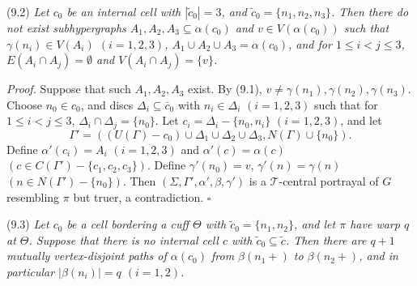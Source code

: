 \stmt
(9.2) \textit{Let $c_0$ be an internal cell with $|\tilde{c}_0| = 3$, and $\tilde{c}_0 = \{n_1, n_2, n_3\}$. Then there do not exist subhypergraphs $A_1, A_2, A_3 \subseteq \alpha(c_0)$ and $v \in V(\alpha(c_0))$ such that $\gamma(n_i) \in V(A_i)$ $(i = 1, 2, 3)$, $A_1 \cup A_2 \cup A_3 = \alpha(c_0)$, and for $1 \le i < j \le 3$, $E(A_i \cap A_j) = \emptyset$ and $V(A_i \cap A_j) = \{v\}$.}

\textit{Proof.} Suppose that such $A_1, A_2, A_3$ exist. By (9.1), $v \ne \gamma(n_1), \gamma(n_2), \gamma(n_3)$. Choose $n_0 \in c_0$, and discs $\Delta_i \subseteq \bar{c}_0$ with $n_i \in \Delta_i$ $(i = 1, 2, 3)$ such that for $1 \le i < j \le 3$, $\Delta_i \cap \Delta_j = \{n_0\}$. Let $c_i = \Delta_i - \{n_0, n_i\}$ $(i = 1, 2, 3)$, and let
\begin{equation*}
\Gamma' = ((U(\Gamma) - c_0) \cup \Delta_1 \cup \Delta_2 \cup \Delta_3, N(\Gamma) \cup \{n_0\}).
\end{equation*}
Define $\alpha'(c_i) = A_i$ $(i = 1, 2, 3)$ and $\alpha'(c) = \alpha(c)$ $(c \in C(\Gamma') - \{c_1, c_2, c_3\})$. Define $\gamma'(n_0) = v$, $\gamma'(n) = \gamma(n)$ $(n \in N(\Gamma') - \{n_0\})$. Then $(\Sigma, \Gamma', \alpha', \beta, \gamma')$ is a $\mathcal{T}$-central portrayal of $G$ resembling $\pi$ but truer, a contradiction. $\square$

\stmt
(9.3) \textit{Let $c_0$ be a cell bordering a cuff $\Theta$ with $\tilde{c}_0 = \{n_1, n_2\}$, and let $\pi$ have warp $q$ at $\Theta$. Suppose that there is no internal cell $c$ with $\tilde{c}_0 \subseteq \tilde{c}$. Then there are $q + 1$ mutually vertex-disjoint paths of $\alpha(c_0)$ from $\beta(n_1 +)$ to $\beta(n_2 +)$, and in particular $|\beta(n_i)| = q$ $(i = 1, 2)$.}

